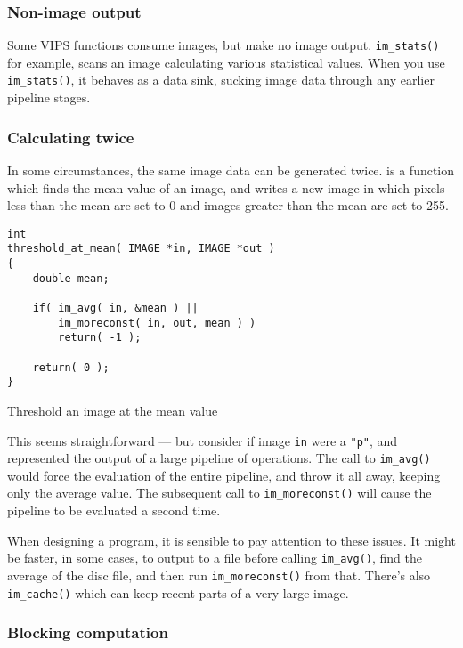 \subsubsection{Non-image output}

Some VIPS functions consume images, but make no image
output. \verb+im_stats()+ for example, scans an image calculating various
statistical values. When you use \verb+im_stats()+, it behaves as a data
sink, sucking image data through any earlier pipeline stages.

\subsubsection{Calculating twice}

In some circumstances, the same image data can be generated twice.
 is a function which finds the mean value of an
image, and writes a new image in which pixels less than the mean are set to
0 and images greater than the mean are set to 255.

\begin{fig2}
\begin{verbatim}
int
threshold_at_mean( IMAGE *in, IMAGE *out )
{
    double mean;

    if( im_avg( in, &mean ) ||
        im_moreconst( in, out, mean ) )
        return( -1 );

    return( 0 );
}
\end{verbatim}
\caption{Threshold an image at the mean value}
\label{fg:thrmean}
\end{fig2}

This seems straightforward --- but consider if image \verb+in+ were a
\verb+"p"+, and represented the output of a large pipeline of operations. The
call to \verb+im_avg()+ would force the evaluation of the entire pipeline,
and throw it all away, keeping only the average value. The subsequent call to
\verb+im_moreconst()+ will cause the pipeline to be evaluated a second time.

When designing a program, it is sensible to pay attention to these
issues. It might be faster, in some cases, to output to a file before
calling \verb+im_avg()+, find the average of the disc file, and then run
\verb+im_moreconst()+ from that. There's also \verb+im_cache()+ which can keep
recent parts of a very large image.

\subsubsection{Blocking computation}
\label{sec:block}

